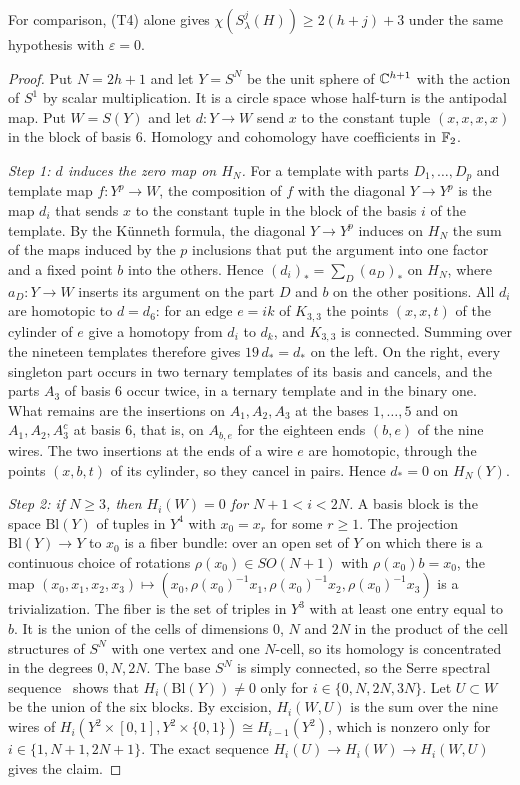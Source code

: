 For comparison, (T4) alone gives $\chi(S^j_\lambda(H))\ge2(h+j)+3$ under the same hypothesis with $\varepsilon=0$.

\begin{proof}
Put $N=2h+1$ and let $Y=S^N$ be the unit sphere of $\mathbb C^{h+1}$ with the action of $S^1$ by scalar multiplication. It is a circle space whose half-turn is the antipodal map. Put $W=S(Y)$ and let $d:Y\to W$ send $x$ to the constant tuple $(x,x,x,x)$ in the block of basis $6$. Homology and cohomology have coefficients in $\mathbb F_2$.

\emph{Step 1: $d$ induces the zero map on $H_N$.} For a template with parts $D_1,\ldots,D_p$ and template map $f:Y^p\to W$, the composition of $f$ with the diagonal $Y\to Y^p$ is the map $d_i$ that sends $x$ to the constant tuple in the block of the basis $i$ of the template. By the K\"unneth formula, the diagonal $Y\to Y^p$ induces on $H_N$ the sum of the maps induced by the $p$ inclusions that put the argument into one factor and a fixed point $b$ into the others. Hence $(d_i)_*=\sum_D(a_D)_*$ on $H_N$, where $a_D:Y\to W$ inserts its argument on the part $D$ and $b$ on the other positions. All $d_i$ are homotopic to $d=d_6$: for an edge $e=ik$ of $K_{3,3}$ the points $(x,x,t)$ of the cylinder of $e$ give a homotopy from $d_i$ to $d_k$, and $K_{3,3}$ is connected. Summing over the nineteen templates therefore gives $19\,d_*=d_*$ on the left. On the right, every singleton part occurs in two ternary templates of its basis and cancels, and the parts $A_3$ of basis $6$ occur twice, in a ternary template and in the binary one. What remains are the insertions on $A_1,A_2,A_3$ at the bases $1,\ldots,5$ and on $A_1,A_2,A_3^c$ at basis $6$, that is, on $A_{b,e}$ for the eighteen ends $(b,e)$ of the nine wires. The two insertions at the ends of a wire $e$ are homotopic, through the points $(x,b,t)$ of its cylinder, so they cancel in pairs. Hence $d_*=0$ on $H_N(Y)$.

\emph{Step 2: if $N\ge3$, then $H_i(W)=0$ for $N+1<i<2N$.} A basis block is the space $\mathrm{Bl}(Y)$ of tuples in $Y^4$ with $x_0=x_r$ for some $r\ge1$. The projection $\mathrm{Bl}(Y)\to Y$ to $x_0$ is a fiber bundle: over an open set of $Y$ on which there is a continuous choice of rotations $\rho(x_0)\in SO(N+1)$ with $\rho(x_0)b=x_0$, the map $(x_0,x_1,x_2,x_3)\mapsto(x_0,\rho(x_0)^{-1}x_1,\rho(x_0)^{-1}x_2,\rho(x_0)^{-1}x_3)$ is a trivialization. The fiber is the set of triples in $Y^3$ with at least one entry equal to $b$. It is the union of the cells of dimensions $0$, $N$ and $2N$ in the product of the cell structures of $S^N$ with one vertex and one $N$-cell, so its homology is concentrated in the degrees $0,N,2N$. The base $S^N$ is simply connected, so the Serre spectral sequence~\cite{Serre} shows that $H_i(\mathrm{Bl}(Y))\ne0$ only for $i\in\{0,N,2N,3N\}$. Let $U\subset W$ be the union of the six blocks. By excision, $H_i(W,U)$ is the sum over the nine wires of $H_i(Y^2\times[0,1],Y^2\times\{0,1\})\cong H_{i-1}(Y^2)$, which is nonzero only for $i\in\{1,N+1,2N+1\}$. The exact sequence $H_i(U)\to H_i(W)\to H_i(W,U)$ gives the claim.


\end{proof}
